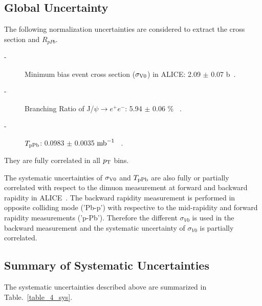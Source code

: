 \subsection{Global Uncertainty}
The following normalization uncertainties are considered to extract the cross section and $R_{pPb}$. 
\begin{description}
  \item[-] Minimum bias event cross section ($\sigma_{\rm{V0}}$) in ALICE: 2.09 $\pm$ 0.07 b~\cite{bib_v0cross}.
  \item[-] Branching Ratio of J/$\psi\rightarrow e^{+}e^{-}$: 5.94 $\pm$ 0.06 \% ~\cite{bib_pdg}.
  \item[-] $T_{\rm{pPb}}$: 0.0983 $\pm$ 0.0035 $\rm{mb}^{-1}$ ~\cite{bib_tppb}.
\end{description}
They are fully correlated in all $p_{\rm{T}}$ bins. 

The systematic uncertainties of $\sigma_{\rm{V0}}$ and $T_{\rm{pPb}}$ are also fully or partially correlated with respect to the dimuon measurement at forward and backward rapidity in ALICE~\cite{bib_alicemuon}. 
The backward rapidity measurement is performed in opposite colliding mode ('Pb-p') with respective to the mid-rapidity and forward rapidity measurements ('p-Pb'). 
Therefore the different $\sigma_{V0}$ is used in the backward measurement and the systematic uncertainty of $\sigma_{V0}$ is partially correlated.  


\subsection{Summary of Systematic Uncertainties}
The systematic uncertainties described above are summarized in Table.~\ref{table_4_sys}.

